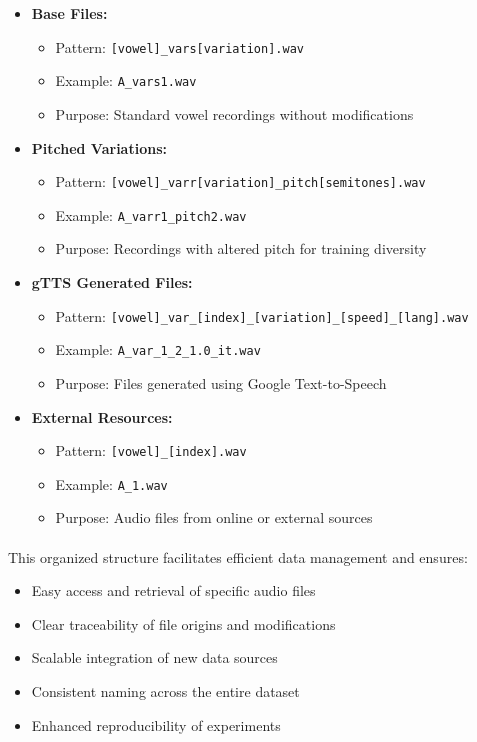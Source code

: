 \begin{itemize}
    \item \textbf{Base Files:}
    \begin{itemize}
        \item Pattern: \texttt{[vowel]\_vars[variation].wav}
        \item Example: \texttt{A\_vars1.wav}
        \item Purpose: Standard vowel recordings without modifications
    \end{itemize}
    
    \item \textbf{Pitched Variations:}
    \begin{itemize}
        \item Pattern: \texttt{[vowel]\_varr[variation]\_pitch[semitones].wav}
        \item Example: \texttt{A\_varr1\_pitch2.wav}
        \item Purpose: Recordings with altered pitch for training diversity
    \end{itemize}
    
    \item \textbf{gTTS Generated Files:}
    \begin{itemize}
        \item Pattern: \texttt{[vowel]\_var\_[index]\_[variation]\_[speed]\_[lang].wav}
        \item Example: \texttt{A\_var\_1\_2\_1.0\_it.wav}
        \item Purpose: Files generated using Google Text-to-Speech
    \end{itemize}
    
    \item \textbf{External Resources:}
    \begin{itemize}
        \item Pattern: \texttt{[vowel]\_[index].wav}
        \item Example: \texttt{A\_1.wav}
        \item Purpose: Audio files from online or external sources
    \end{itemize}
\end{itemize}

\paragraph{}
This organized structure facilitates efficient data management and ensures:
\begin{itemize}
    \item Easy access and retrieval of specific audio files
    \item Clear traceability of file origins and modifications
    \item Scalable integration of new data sources
    \item Consistent naming across the entire dataset
    \item Enhanced reproducibility of experiments
\end{itemize}

